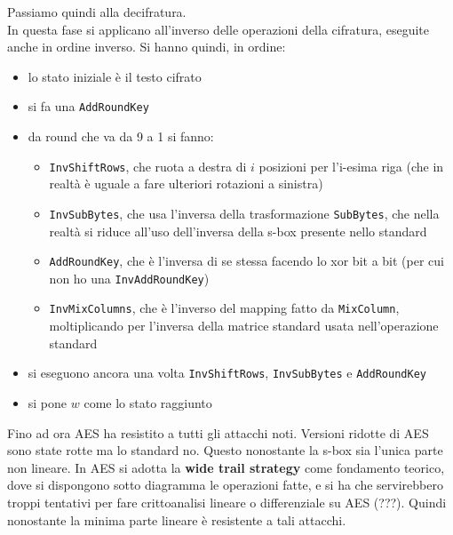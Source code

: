 \documentclass[a4paper,12pt, oneside]{book}
\begin{document}
Passiamo quindi alla decifratura.\\
In questa fase si applicano all'inverso delle operazioni della cifratura,
eseguite anche in ordine inverso. Si hanno quindi, in ordine:
\begin{itemize}
  \item lo stato iniziale è il testo cifrato
  \item si fa una \texttt{AddRoundKey}
  \item da round che va da 9 a 1 si fanno:
  \begin{itemize}
    \item \texttt{InvShiftRows}, che ruota a destra di $i$ posizioni per
    l'i-esima riga (che in realtà è uguale a fare ulteriori rotazioni a
    sinistra) 
    \item \texttt{InvSubBytes}, che usa l'inversa della trasformazione
    \texttt{SubBytes}, che nella realtà si riduce all'uso dell'inversa della
    s-box presente nello standard
    \item \texttt{AddRoundKey}, che è l'inversa di se stessa facendo lo xor bit
    a bit (per cui non ho una \texttt{InvAddRoundKey})
    \item \texttt{InvMixColumns}, che è l'inverso del mapping fatto da
    \texttt{MixColumn}, moltiplicando per l'inversa della matrice standard usata
    nell'operazione standard 
  \end{itemize}
  \item si eseguono ancora una volta \texttt{InvShiftRows}, \texttt{InvSubBytes}
  e \texttt{AddRoundKey}
  \item si pone $w$ come lo stato raggiunto 
\end{itemize}
Fino ad ora AES ha resistito a tutti gli attacchi noti. Versioni ridotte di AES
sono state rotte ma lo standard no. Questo nonostante la s-box sia l'unica parte
non lineare. In AES si adotta la \textbf{wide trail strategy} come fondamento
teorico, dove si dispongono sotto diagramma le operazioni fatte, e si ha che
servirebbero troppi tentativi per fare crittoanalisi lineare o differenziale su
AES (???). Quindi nonostante la minima parte lineare è resistente a tali
attacchi.  \\
\end{document}
